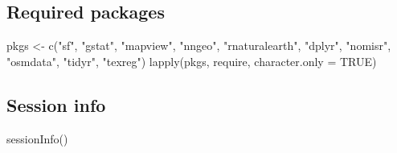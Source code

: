 \documentclass[
  letterpaper,
]{scrbook}
\newenvironment{Shaded}{\begin{snugshade}}{\end{snugshade}}
\newcommand{\AttributeTok}[1]{\textcolor[rgb]{0.40,0.45,0.13}{#1}}
\newcommand{\ConstantTok}[1]{\textcolor[rgb]{0.56,0.35,0.01}{#1}}
\newcommand{\FunctionTok}[1]{\textcolor[rgb]{0.28,0.35,0.67}{#1}}
\newcommand{\NormalTok}[1]{\textcolor[rgb]{0.00,0.23,0.31}{#1}}
\newcommand{\OtherTok}[1]{\textcolor[rgb]{0.00,0.23,0.31}{#1}}
\newcommand{\StringTok}[1]{\textcolor[rgb]{0.13,0.47,0.30}{#1}}
\begin{document}
\hypertarget{required-packages}{%
\subsection*{Required packages}\label{required-packages}}

\begin{Shaded}
\begin{Highlighting}[]
\NormalTok{pkgs }\OtherTok{\textless{}{-}} \FunctionTok{c}\NormalTok{(}\StringTok{"sf"}\NormalTok{, }\StringTok{"gstat"}\NormalTok{, }\StringTok{"mapview"}\NormalTok{, }\StringTok{"nngeo"}\NormalTok{, }\StringTok{"rnaturalearth"}\NormalTok{, }\StringTok{"dplyr"}\NormalTok{,}
          \StringTok{"nomisr"}\NormalTok{, }\StringTok{"osmdata"}\NormalTok{, }\StringTok{"tidyr"}\NormalTok{, }\StringTok{"texreg"}\NormalTok{) }
\FunctionTok{lapply}\NormalTok{(pkgs, require, }\AttributeTok{character.only =} \ConstantTok{TRUE}\NormalTok{)}
\end{Highlighting}
\end{Shaded}

\hypertarget{session-info}{%
\subsection*{Session info}\label{session-info}}

\begin{Shaded}
\begin{Highlighting}[]
\FunctionTok{sessionInfo}\NormalTok{()}
\end{Highlighting}
\end{Shaded}
\end{document}
